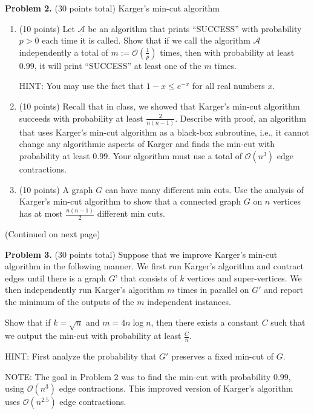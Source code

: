 \documentclass[11pt]{article}
\begin{document}
\vskip 0.2in\noindent
\textbf{Problem 2.} (30 points total)
Karger's min-cut algorithm
\begin{enumerate}
\item (10 points)
Let $\mathcal{A}$ be an algorithm that prints ``SUCCESS'' with probability $p>0$ each time it is called. 
Show that if we call the algorithm $\mathcal{A}$ independently a total of $m:=\mathcal{O}\left(\frac{1}{p}\right)$ times, then with probability at least $0.99$, it will print ``SUCCESS'' at least one of the $m$ times. 

\noindent
HINT: You may use the fact that $1-x\le e^{-x}$ for all real numbers $x$. 
\item (10 points)
Recall that in class, we showed that Karger's min-cut algorithm succeeds with probability at least $\frac{2}{n(n-1)}$. 
Describe with proof, an algorithm that uses Karger's min-cut algorithm as a black-box subroutine, i.e., it cannot change any algorithmic aspects of Karger and finds the min-cut with probability at least $0.99$. 
Your algorithm must use a total of $\mathcal{O}(n^3)$ edge contractions. 
\item (10 points)
A graph $G$ can have many different min cuts. 
Use the analysis of Karger's min-cut algorithm to show that a connected graph $G$ on $n$ vertices has at most $\frac{n(n-1)}{2}$ different min cuts. 
\end{enumerate}
\vskip 0.5in\noindent
\begin{center}
(Continued on next page)
\end{center}
\newpage
\noindent
\textbf{Problem 3.} (30 points total)
Suppose that we improve Karger's min-cut algorithm in the following manner. 
We first run Karger's algorithm and contract edges until there is a graph $G$' that consists of $k$ vertices and super-vertices. 
We then independently run Karger's algorithm $m$ times in parallel on $G'$ and report the minimum of the outputs of the $m$ independent instances. 

\vskip 0.1in\noindent
Show that if $k=\sqrt{n}$ and $m=4n\log n$, then there exists a constant $C$ such that we output the min-cut with probability at least $\frac{C}{n}$. 

\vskip 0.1in\noindent
HINT: First analyze the probability that $G'$ preserves a fixed min-cut of $G$. 

\vskip 0.1in\noindent
NOTE: The goal in Problem 2 was to find the min-cut with probability $0.99$, using $\mathcal{O}(n^3)$ edge contractions. 
This improved version of Karger's algorithm uses $\mathcal{O}(n^{2.5})$ edge contractions. 
\end{document}

